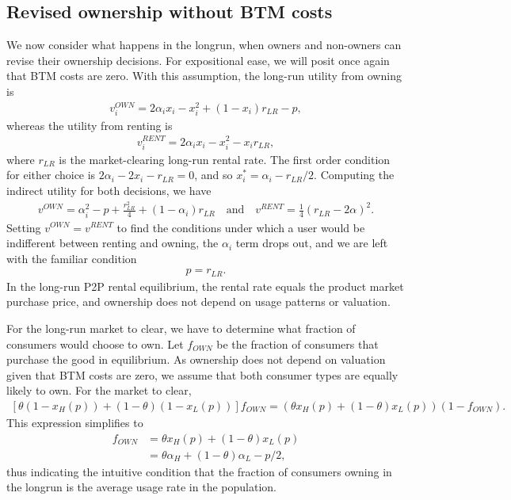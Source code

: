 \documentclass[11pt]{article}
\begin{document}
\subsection{Revised ownership without BTM costs}
We now consider what happens in the longrun, when owners and non-owners can revise their ownership decisions.
For expositional ease, we will posit once again that BTM costs are zero. 
With this assumption, the long-run utility from owning is 
\begin{align}
v^{OWN}_i = 2\alpha_i x_i - x_i^2 + (1-x_i)r_{LR} - p,   
\end{align} 
whereas the utility from renting is 
\begin{align}
v^{RENT}_{i} = 2\alpha_i x_i - x_i^2 - x_i r_{LR}, 
\end{align} 
where $r_{LR}$ is the market-clearing long-run rental rate. 
The first order condition for either choice is $2 \alpha_i - 2 x_i - r_{LR} = 0$, and so $x^*_i = \alpha_i - r_{LR}/2$. 
Computing the indirect utility for both decisions, we have
\begin{align} 
v^{OWN} = \alpha_i^2 - p + \frac{r_{LR}^2}{4} + (1 - \alpha_i) r_{LR} \quad  \mbox{and} \quad v^{RENT} = \frac{1}{4} (r_{LR}- 2\alpha )^2. 
\end{align} 
Setting $v^{OWN} = v^{RENT}$ to find the conditions under which a user would be indifferent between renting and owning, the $\alpha_i$ term drops out, and we are left with the familiar condition 
\begin{align} \label{eq:lr_eq_r}
p = r_{LR}. 
\end{align}
In the long-run P2P rental equilibrium, the rental rate equals the product market purchase price, and ownership does not depend on usage patterns or valuation.  

For the long-run market to clear, we have to determine what fraction of consumers would choose to own. 
Let $f_{OWN}$ be the fraction of consumers that purchase the good in equilibrium. 
As ownership does not depend on valuation given that BTM costs are zero, we assume that both consumer types are equally likely to own. 
For the market to clear, 
\begin{align}
\left[ \theta (1-x_H(p)) + (1-\theta)(1-x_L(p))\right]f_{OWN} = \left(\theta x_H(p) + (1-\theta)x_L(p) \right)(1- f_{OWN}). 
\end{align} 
This expression simplifies to 
\begin{align}
  f_{OWN} &= \theta x_H(p) + (1-\theta)x_L(p) \\
         &= \theta \alpha_H + (1 - \theta) \alpha_L- p/2,
\end{align} 
thus indicating the intuitive condition that the fraction of consumers owning in the longrun is the average usage rate in the population.  
\end{document}
